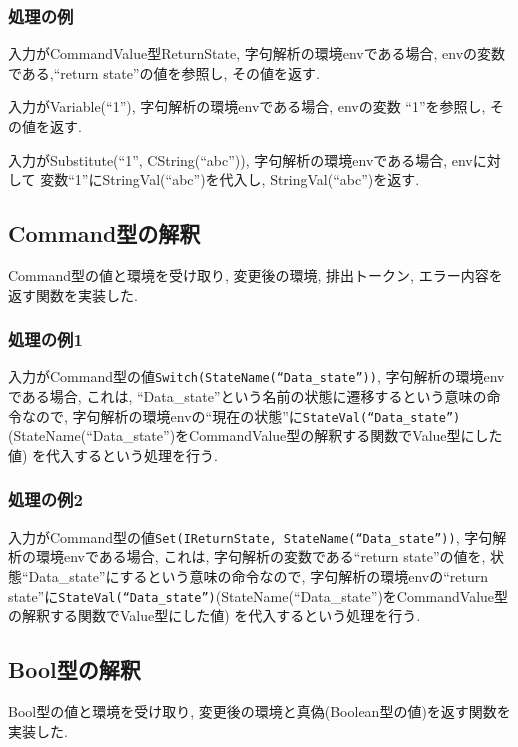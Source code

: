 \documentclass[uplatex,a4j]{jsreport}
\begin{document}
\subsubsection{処理の例}
入力がCommandValue型ReturnState, 字句解析の環境envである場合, 
envの変数である,``return state''の値を参照し, その値を返す. 

入力がVariable(``1''), 字句解析の環境envである場合, 
envの変数 ``1''を参照し, その値を返す. 

入力がSubstitute(``1'', CString(``abc'')), 字句解析の環境envである場合, 
envに対して 変数``1''にStringVal(``abc'')を代入し, StringVal(``abc'')を返す.
\subsection{Command型の解釈}
Command型の値と環境を受け取り, 変更後の環境, 排出トークン, エラー内容を返す関数を実装した. 

\subsubsection{処理の例1}
入力がCommand型の値\texttt{Switch(StateName(``Data_state''))}, 字句解析の環境envである場合, 
これは, ``Data_state''という名前の状態に遷移するという意味の命令なので, 
字句解析の環境envの``現在の状態''に\texttt{StateVal(``Data_state'')}(StateName(``Data_state'')をCommandValue型の解釈する関数でValue型にした値)
を代入するという処理を行う. 
\subsubsection{処理の例2}
入力がCommand型の値\texttt{Set(IReturnState, StateName(``Data_state''))}, 字句解析の環境envである場合, 
これは, 字句解析の変数である``return state''の値を, 状態``Data_state''にするという意味の命令なので, 
字句解析の環境envの``return state''に\texttt{StateVal(``Data_state'')}(StateName(``Data_state'')をCommandValue型の解釈する関数でValue型にした値)
を代入するという処理を行う.

\subsection{Bool型の解釈}
Bool型の値と環境を受け取り, 変更後の環境と真偽(Boolean型の値)を返す関数を実装した. 
\end{document}
